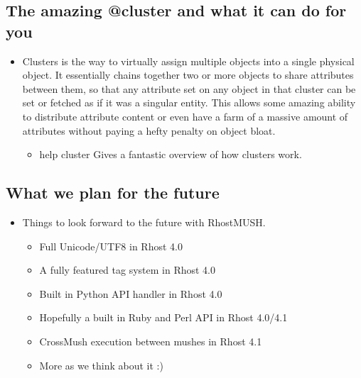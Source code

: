 \documentclass[letterpaper,10pt,english]{sphinxmanual}
\begin{document}
\subsection{The amazing @cluster and what it can do for you}
\label{\detokenize{features:the-amazing-cluster-and-what-it-can-do-for-you}}\begin{itemize}
\item {} 
\sphinxAtStartPar
Clusters is the way to virtually assign multiple objects into
a single physical object.  It essentially chains together two
or more objects to share attributes between them, so that any
attribute set on any object in that cluster can be set or fetched
as if it was a singular entity.  This allows some amazing ability
to distribute attribute content or even have a farm of a massive
amount of attributes without paying a hefty penalty on object bloat.
\begin{itemize}
\item {} 
\sphinxAtStartPar
help cluster  \textendash{} Gives a fantastic overview of how clusters work.

\end{itemize}

\end{itemize}


\subsection{What we plan for the future}
\label{\detokenize{features:what-we-plan-for-the-future}}\begin{itemize}
\item {} 
\sphinxAtStartPar
Things to look forward to the future with RhostMUSH.
\begin{itemize}
\item {} 
\sphinxAtStartPar
Full Unicode/UTF8 in Rhost 4.0

\item {} 
\sphinxAtStartPar
A fully featured tag system in Rhost 4.0

\item {} 
\sphinxAtStartPar
Built in Python API handler in Rhost 4.0

\item {} 
\sphinxAtStartPar
Hopefully a built in Ruby and Perl API in Rhost 4.0/4.1

\item {} 
\sphinxAtStartPar
Cross\sphinxhyphen{}Mush execution between mushes in Rhost 4.1

\item {} 
\sphinxAtStartPar
More as we think about it :)

\end{itemize}

\end{itemize}
\end{document}
